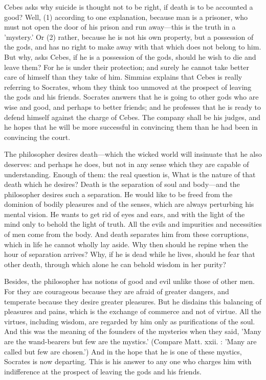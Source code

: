 \documentclass[11pt,letter]{article}
\begin{document}
\par  Cebes asks why suicide is thought not to be right, if death is to be accounted a good? Well, (1) according to one explanation, because man is a prisoner, who must not open the door of his prison and run away—this is the truth in a 'mystery.' Or (2) rather, because he is not his own property, but a possession of the gods, and has no right to make away with that which does not belong to him. But why, asks Cebes, if he is a possession of the gods, should he wish to die and leave them? For he is under their protection; and surely he cannot take better care of himself than they take of him. Simmias explains that Cebes is really referring to Socrates, whom they think too unmoved at the prospect of leaving the gods and his friends. Socrates answers that he is going to other gods who are wise and good, and perhaps to better friends; and he professes that he is ready to defend himself against the charge of Cebes. The company shall be his judges, and he hopes that he will be more successful in convincing them than he had been in convincing the court.

\par  The philosopher desires death—which the wicked world will insinuate that he also deserves: and perhaps he does, but not in any sense which they are capable of understanding. Enough of them: the real question is, What is the nature of that death which he desires? Death is the separation of soul and body—and the philosopher desires such a separation. He would like to be freed from the dominion of bodily pleasures and of the senses, which are always perturbing his mental vision. He wants to get rid of eyes and ears, and with the light of the mind only to behold the light of truth. All the evils and impurities and necessities of men come from the body. And death separates him from these corruptions, which in life he cannot wholly lay aside. Why then should he repine when the hour of separation arrives? Why, if he is dead while he lives, should he fear that other death, through which alone he can behold wisdom in her purity?

\par  Besides, the philosopher has notions of good and evil unlike those of other men. For they are courageous because they are afraid of greater dangers, and temperate because they desire greater pleasures. But he disdains this balancing of pleasures and pains, which is the exchange of commerce and not of virtue. All the virtues, including wisdom, are regarded by him only as purifications of the soul. And this was the meaning of the founders of the mysteries when they said, 'Many are the wand-bearers but few are the mystics.' (Compare Matt. xxii. : 'Many are called but few are chosen.') And in the hope that he is one of these mystics, Socrates is now departing. This is his answer to any one who charges him with indifference at the prospect of leaving the gods and his friends.
\end{document}
